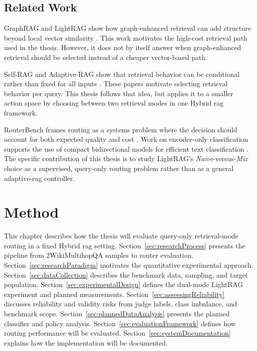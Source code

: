 \documentclass[english, bibtex]{kththesis}               %
\numberwithin{listing}{chapter}
\begin{document}
\section{Related Work}
\label{sec:relatedWork}

GraphRAG and LightRAG show how graph-enhanced retrieval can add structure beyond local vector similarity \cite{edge2024graphrag,lightrag2024}. This work motivates the high-cost retrieval path used in the thesis. However, it does not by itself answer when graph-enhanced retrieval should be selected instead of a cheaper vector-based path.

Self-RAG and Adaptive-RAG show that retrieval behavior can be conditional rather than fixed for all inputs \cite{asai2023selfrag,jeong2024adaptiverag}. These papers motivate selecting retrieval behavior per query. This thesis follows that idea, but applies it to a smaller action space by choosing between two retrieval modes in one Hybrid \gls{rag} framework.

RouterBench frames routing as a systems problem where the decision should account for both expected quality and cost \cite{hu2024routerbench}. Work on encoder-only classification supports the use of compact bidirectional models for efficient text classification \cite{devlin2019bert,benayas2024encoder,warner2024modernbert}. The specific contribution of this thesis is to study LightRAG's \emph{Naive}-versus-\emph{Mix} choice as a supervised, query-only routing problem rather than as a general adaptive-\gls{rag} controller.

\cleardoublepage
\chapter{Method}
\label{ch:methods}
This chapter describes how the thesis will evaluate query-only retrieval-mode routing in a fixed Hybrid \gls{rag} setting. Section~\ref{sec:researchProcess} presents the pipeline from 2WikiMultihopQA samples to router evaluation. Section~\ref{sec:researchParadigm} motivates the quantitative experimental approach. Section~\ref{sec:dataCollection} describes the benchmark data, sampling, and target population. Section~\ref{sec:experimentalDesign} defines the dual-mode LightRAG experiment and planned measurements. Section~\ref{sec:assessingReliability} discusses reliability and validity risks from judge labels, class imbalance, and benchmark scope. Section~\ref{sec:plannedDataAnalysis} presents the planned classifier and policy analysis. Section~\ref{sec:evaluationFramework} defines how routing performance will be evaluated. Section~\ref{sec:systemDocumentation} explains how the implementation will be documented.
\end{document}
